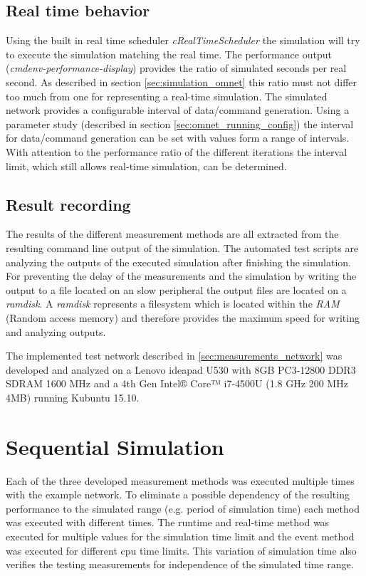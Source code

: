 \subsection{Real time behavior}
\label{sec:measurements_methods_realtime}
Using the built in real time scheduler \emph{cRealTimeScheduler} the simulation will try to execute the simulation matching the real time.
The performance output (\emph{cmdenv-performance-display}) provides the ratio of simulated seconds per real second.
As described in section \ref{sec:simulation_omnet} this ratio must not differ too much from one for representing a real-time simulation.
The simulated network provides a configurable interval of data/command generation.
Using a parameter study (described in section \ref{sec:omnet_running_config}) the interval for data/command generation can be set with values form a range of intervals.
With attention to the performance ratio of the different iterations the interval limit, which still allows real-time simulation, can be determined.

\subsection{Result recording}
The results of the different measurement methods are all extracted from the resulting command line output of the simulation.
The automated test scripts are analyzing the outputs of the executed simulation after finishing the simulation.
For preventing the delay of the measurements and the simulation by writing the output to a file located on an slow peripheral the output files are located on a \emph{ramdisk}.
A \emph{ramdisk} represents a filesystem which is located within the \emph{RAM} (Random access memory) and therefore provides the maximum speed for writing and analyzing outputs.

The implemented test network described in \ref{sec:measurements_network} was developed and analyzed on a Lenovo ideapad U530 with 8GB PC3-12800 DDR3 SDRAM 1600 MHz and a 4th Gen Intel® Core™ i7-4500U (1.8 GHz 200 MHz 4MB) running Kubuntu 15.10.
\cite{lenovo_spec}\\



\section{Sequential Simulation}
\label{sec:measurements_sequential}
Each of the three developed measurement methods was executed multiple times with the example network.
To eliminate a possible dependency of the resulting performance to the simulated range (e.g. period of simulation time) each method was executed with different times.
The runtime and real-time method was executed for multiple values for the simulation time limit and the event method was executed for different cpu time limits.
This variation of simulation time also verifies the testing measurements for independence of the simulated time range.

